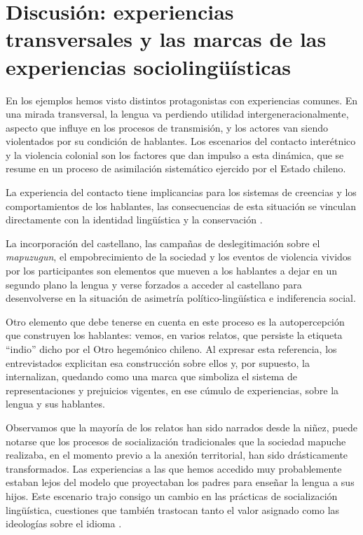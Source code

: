 \documentclass[output=paper]{../langscibook}
\begin{document}
\section{Discusión: experiencias transversales y las marcas de las experiencias sociolingüísticas}\label{sec:olate:6}


En los ejemplos hemos visto distintos protagonistas con experiencias comunes. En una mirada transversal, la lengua va perdiendo utilidad intergeneracionalmente, aspecto que influye en los procesos de transmisión, y los actores van siendo violentados por su condición de hablantes. Los escenarios del contacto interétnico y la violencia colonial son los factores que dan impulso a esta dinámica, que se resume en un proceso de asimilación sistemático ejercido por el Estado chileno. 

La experiencia del contacto tiene implicancias para los sistemas de creencias y los comportamientos de los hablantes, las consecuencias de esta situación se vinculan directamente con la identidad lingüística y la conservación \citep{Gundermann2014}.  

La incorporación del castellano, las campañas de deslegitimación sobre el \textit{mapuzugun}, el empobrecimiento de la sociedad y los eventos de violencia vividos por los participantes son elementos que mueven a los hablantes a dejar en un segundo plano la lengua y verse forzados a acceder al castellano para desenvolverse en la situación de asimetría político-lingüística e indiferencia social.

Otro elemento que debe tenerse en cuenta en este proceso es la autopercepción que construyen los hablantes: vemos, en varios relatos, que persiste la etiqueta “indio” dicho por el Otro hegemónico chileno. Al expresar esta referencia, los entrevistados explicitan esa construcción sobre ellos y, por supuesto, la internalizan, quedando como una marca que simboliza el sistema de representaciones y prejuicios vigentes, en ese cúmulo de experiencias, sobre la lengua y sus hablantes.

Observamos que la mayoría de los relatos han sido narrados desde la niñez, puede notarse que los procesos de socialización tradicionales que la sociedad mapuche realizaba, en el momento previo a la anexión territorial, han sido drásticamente transformados. Las experiencias a las que hemos accedido muy probablemente estaban lejos del modelo que proyectaban los padres para enseñar la lengua a sus hijos. Este escenario trajo consigo un cambio en las prácticas de socialización lingüística, cuestiones que también trastocan tanto el valor asignado como las ideologías sobre el idioma \citep{Duranti2000}.
\end{document}
